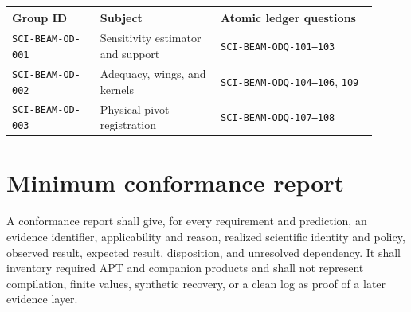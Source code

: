 \documentclass[10pt]{article}
\begin{document}
\begin{longtable}{L{0.22\linewidth}L{0.30\linewidth}L{0.39\linewidth}}
\toprule Group ID & Subject & Atomic ledger questions \\
\midrule
\texttt{SCI-BEAM-OD-001} & Sensitivity estimator and support & \texttt{SCI-BEAM-ODQ-101--103} \\
\texttt{SCI-BEAM-OD-002} & Adequacy, wings, and kernels & \texttt{SCI-BEAM-ODQ-104--106}, \texttt{109} \\
\texttt{SCI-BEAM-OD-003} & Physical pivot registration & \texttt{SCI-BEAM-ODQ-107--108} \\
\bottomrule
\end{longtable}

\clearpage

\clearpage

\clearpage

\clearpage

\clearpage

\clearpage


\section{Minimum conformance report}

A conformance report shall give, for every requirement and prediction, an
evidence identifier, applicability and reason, realized scientific identity
and policy, observed result, expected result, disposition, and unresolved
dependency. It shall inventory required APT and companion products and shall
not represent compilation, finite values, synthetic recovery, or a clean log
as proof of a later evidence layer.
\end{document}
